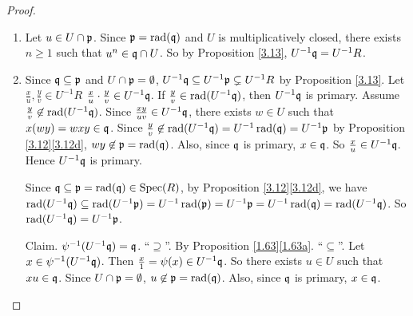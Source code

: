 \begin{proof}
    \begin{enumerate}
        \item Let $u \in U \cap \mathfrak{p}$. Since $\mathfrak{p} = \operatorname{rad}(\mathfrak{q})$ and $U$ is multiplicatively closed, there exists $n \geq 1$ such that $u^{n} \in \mathfrak{q} \cap U$. So by Proposition \ref{3.13}, $U^{-1}\mathfrak{q} = U^{-1}R$.
        \item Since $\mathfrak{q} \subseteq \mathfrak{p}$ and $U \cap \mathfrak{p} = \emptyset$, $U^{-1}\mathfrak{q} \subseteq U^{-1}\mathfrak{p} \subsetneq U^{-1}R$ by Proposition \ref{3.13}. Let $\frac{x}{u},\frac{y}{v} \in U^{-1}R$ $\frac{x}{u} \cdot \frac{y}{v} \in U^{-1}\mathfrak{q}$. If $\frac{y}{v} \in \operatorname{rad}(U^{-1}\mathfrak{q})$, then $U^{-1}\mathfrak{q}$ is primary. Assume $\frac{y}{v} \not \in \operatorname{rad}(U^{-1}\mathfrak{q})$. Since $\frac{xy}{uv} \in U^{-1}\mathfrak{q}$, there exists $w \in U$ such that $x(wy) = wxy \in \mathfrak{q}$. Since $\frac{y}{v} \not\in \operatorname{rad}(U^{-1}\mathfrak{q}) = U^{-1} \operatorname{rad}(\mathfrak{q}) = U^{-1}\mathfrak{p}$ by Proposition \ref{3.12}\ref{3.12d}, $wy \not \in \mathfrak{p} = \operatorname{rad}(\mathfrak{q})$. Also, since $\mathfrak{q}$ is primary, $x \in \mathfrak{q}$. So $\frac{x}{u} \in U^{-1}\mathfrak{q}$. Hence $U^{-1}\mathfrak{q}$ is primary. \par 
            Since $\mathfrak{q} \subseteq \mathfrak{p} = \operatorname{rad}(\mathfrak{q}) \in \operatorname{Spec}(R)$, by Proposition \ref{3.12}\ref{3.12d}, we have $\operatorname{rad}(U^{-1}\mathfrak{q}) \subseteq \operatorname{rad}(U^{-1}\mathfrak{p}) = U^{-1} \operatorname{rad}(\mathfrak{p}) = U^{-1}\mathfrak{p} = U^{-1} \operatorname{rad}(\mathfrak{q}) = \operatorname{rad}(U^{-1}\mathfrak{q})$. So $\operatorname{rad}(U^{-1}\mathfrak{q}) = U^{-1}\mathfrak{p}$. \par
            Claim. $\psi^{-1}(U^{-1}\mathfrak{q}) = \mathfrak{q}$. ``$\supseteq$''. By Proposition \ref{1.63}\ref{1.63a}. ``$\subseteq$''. Let $x \in \psi^{-1}(U^{-1}\mathfrak{q})$. Then $\frac{x}{1} = \psi(x) \in U^{-1}\mathfrak{q}$. So there exists $u \in U$ such that $xu \in \mathfrak{q}$. Since $U \cap \mathfrak{p} = \emptyset$, $u \not \in \mathfrak{p} = \operatorname{rad}(\mathfrak{q})$. Also, since $\mathfrak{q}$ is primary, $x \in \mathfrak{q}$. \qedhere
    \end{enumerate}
\end{proof}

